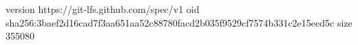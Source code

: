version https://git-lfs.github.com/spec/v1
oid sha256:3baef2d16cad7f3aa651aa52c88780facd2b035f9529cf7574b331c2e15eed5c
size 355080

